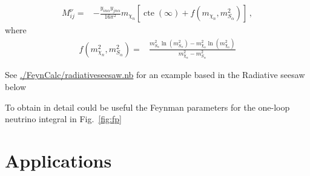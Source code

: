 \begin{align}
 M^{\nu}_{ij}=&-\frac{y_{i n\alpha}y_{j n\alpha}}{16\pi^2}m_{\chi_n} \left[ \operatorname{cte}(\infty)+
f \left( m_{\chi_n},m_{S_{\alpha}}^2 \right) \right] \,,
\end{align}
where
\begin{align}
f \left( m_{\chi_n}^2,m_{S_{\alpha}}^2 \right)=&  
\frac{m_{S_{\alpha}}^2\ln \left(m_{S_{\alpha}}^2\right)-m_{\chi_n}^2\ln \left(m_{\chi_n}^2  \right)}{m_{\chi_n}^2-m_{S_{\alpha}}^2}
\end{align}

See \url{./FeynCalc/radiativeseesaw.nb} for an example based in the Radiative seesaw below


To obtain in detail could be useful the Feynman parameters for the one-loop neutrino integral in Fig.~\ref{fig:fp}




\section{Applications}


